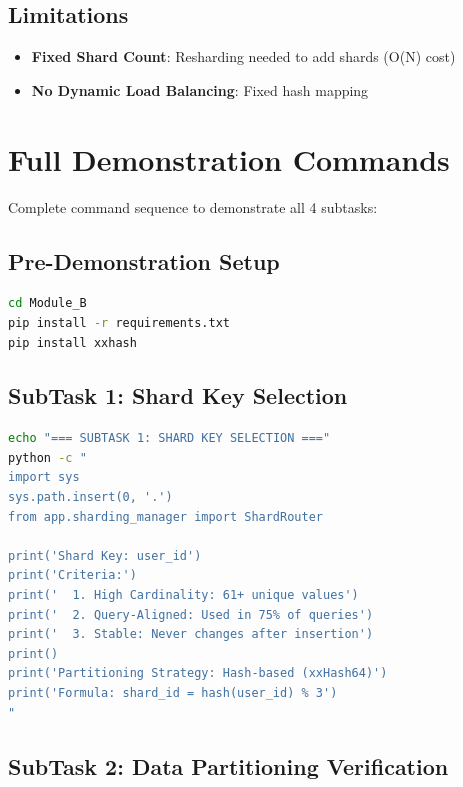 \documentclass[11pt,a4paper]{article}
\begin{document}
\subsection*{Limitations}

\begin{itemize}
    \item \textbf{Fixed Shard Count}: Resharding needed to add shards (O(N) cost)
    \item \textbf{No Dynamic Load Balancing}: Fixed hash mapping
\end{itemize}

\section{Full Demonstration Commands}

Complete command sequence to demonstrate all 4 subtasks:

\subsection*{Pre-Demonstration Setup}

\begin{lstlisting}[language=bash]
cd Module_B
pip install -r requirements.txt
pip install xxhash
\end{lstlisting}

\subsection*{SubTask 1: Shard Key Selection}

\begin{lstlisting}[language=bash]
echo "=== SUBTASK 1: SHARD KEY SELECTION ==="
python -c "
import sys
sys.path.insert(0, '.')
from app.sharding_manager import ShardRouter

print('Shard Key: user_id')
print('Criteria:')
print('  1. High Cardinality: 61+ unique values')
print('  2. Query-Aligned: Used in 75% of queries')
print('  3. Stable: Never changes after insertion')
print()
print('Partitioning Strategy: Hash-based (xxHash64)')
print('Formula: shard_id = hash(user_id) % 3')
"
\end{lstlisting}

\subsection*{SubTask 2: Data Partitioning Verification}
\end{document}
